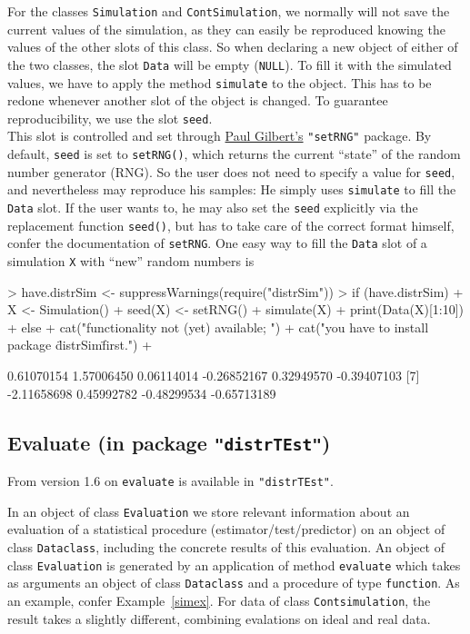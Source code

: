 \documentclass[11pt]{article}
\newcommand{\code}[1]{{\tt #1}}
\newcommand{\pkg}[1]{{\tt "#1"}}
\begin{document}
For the classes \code{Simulation} and \code{ContSimulation}, we normally will
not save the current values of the simulation, as they can easily be reproduced
knowing the values of the other slots of this class.
%
So when declaring a new object of either of the two classes, the slot 
\code{Data} will be empty (\code{NULL}).
To fill it with the simulated values, we have to apply the method 
\code{simulate} to the object. This has to be redone whenever another slot of 
the object is changed.
%
To guarantee reproducibility, we use the slot \code{seed}.\\
%
This slot is controlled and set through 
\href{mailto:pgilbert@bank-banque-canada.ca}{Paul Gilbert's} \pkg{setRNG} 
package.
By default, \code{seed} is set to \code{setRNG()}, which returns the current 
``state'' of the random number generator (RNG). So the user does not need to 
specify a value for \code{seed}, and nevertheless may reproduce his samples: 
He simply uses \code{simulate} to fill the \code{Data} slot.
If the user wants to, he may also set the \code{seed} explicitly via the 
replacement function \code{seed()}, but has to take care of the correct format 
himself, confer the documentation of \code{setRNG}. One easy way to fill 
the \code{Data} slot of a simulation \code{X} with ``new'' random numbers is
\begin{Schunk}
\begin{Sinput}
> have.distrSim <- suppressWarnings(require("distrSim"))
> if (have.distrSim)
+    {X <- Simulation()
+     seed(X) <- setRNG()
+     simulate(X)
+     print(Data(X)[1:10])
+    } else { 
+     cat("\n functionality not (yet) available; ")
+     cat("you have to install package \"distrSim\" first.\n")
+     }
\end{Sinput}
\begin{Soutput}
 [1]  0.61070154  1.57006450  0.06114014 -0.26852167  0.32949570 -0.39407103
 [7] -2.11658698  0.45992782 -0.48299534 -0.65713189
\end{Soutput}
\end{Schunk}
%
\subsection[Evaluate (in package distrTEst)]%
{Evaluate (in package \pkg{distrTEst})}\label{evaluate}
%
From version 1.6 on \code{evaluate} is available in  \pkg{distrTEst}.

In an object of class \code{Evaluation}  we store relevant information
about an evaluation of a statistical procedure (estimator/test/predictor)
on an object of class \code{Dataclass}, including the concrete results of
this evaluation. An object of class \code{Evaluation}  is generated by an 
application of method \code{evaluate} which takes as arguments an object of 
class  \code{Dataclass} and a procedure of type \code{function}. As an example, 
confer Example~\ref{simex}.
For data of class \code{Contsimulation}, the result takes a slightly different,
combining evalations on ideal and real data.
%
\end{document}
